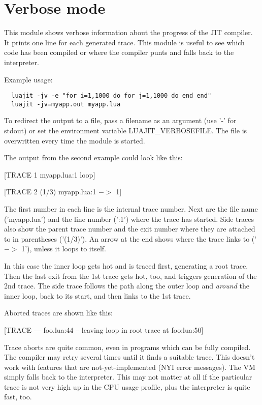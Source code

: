 \section{Verbose mode}

This module shows verbose information about the progress of the
JIT compiler. It prints one line for each generated trace. This module
is useful to see which code has been compiled or where the compiler
punts and falls back to the interpreter.

Example usage:

\begin{lstlisting}
  luajit -jv -e "for i=1,1000 do for j=1,1000 do end end"
  luajit -jv=myapp.out myapp.lua
\end{lstlisting}
To redirect the output to a file, pass a
filename as an argument (use '-' for stdout) or set the environment
variable LUAJIT\_VERBOSEFILE. The file is overwritten every time the
module is started.

The output from the second example could look like this:

\begin{center}
[TRACE   1 myapp.lua:1 loop]

[TRACE   2 (1/3) myapp.lua:1 $->$ 1]
\end{center}

The first number in each line is the internal trace number. Next are
the file name ('myapp.lua') and the line number (':1') where the
trace has started. Side traces also show the parent trace number and
the exit number where they are attached to in parentheses ('(1/3)').
An arrow at the end shows where the trace links to ('$->$ 1'), unless
it loops to itself.

In this case the inner loop gets hot and is traced first, generating
a root trace. Then the last exit from the 1st trace gets hot, too,
and triggers generation of the 2nd trace. The side trace follows the
path along the outer loop and \textit{around} the inner loop, back to its
start, and then links to the 1st trace.

Aborted traces are shown like this:
\begin{center}
[TRACE --- foo.lua:44 -- leaving loop in root trace at foo:lua:50]
\end{center}

Trace aborts are quite common, even in programs which
can be fully compiled. The compiler may retry several times until it
finds a suitable trace. This doesn't work with features that are
not-yet-implemented (NYI error messages). The VM simply falls back to the
interpreter. This may not matter at all if the particular trace is not very high
up in the CPU usage profile, plus the interpreter is quite fast, too.

